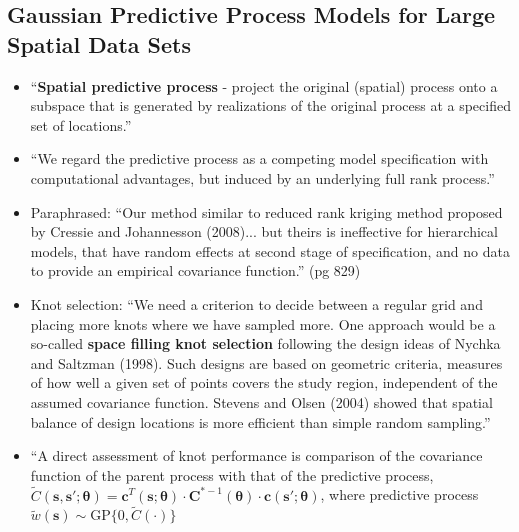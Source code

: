 \documentclass{article}
\begin{document}
\subsection*{Gaussian Predictive Process Models for Large Spatial Data Sets \citep{Banerjee2008}} %
\begin{itemize}
\item ``{\bf Spatial predictive process} - project the original (spatial) process onto a subspace that is generated by realizations of the original process at a specified set of locations.''
\item ``We regard the predictive process as a competing model specification with computational advantages, but induced by an underlying full rank process.''
\item Paraphrased: ``Our method similar to reduced rank kriging method proposed by Cressie and Johannesson (2008)... but theirs is ineffective for hierarchical models, that have random effects at second stage of specification, and no data to provide an empirical covariance function.'' (pg 829)
\item Knot selection: ``We need a criterion to decide between a regular grid and placing more knots where we have sampled more. One approach would be a so-called {\bf space filling knot selection} following the design ideas of Nychka and Saltzman (1998). Such designs are based on geometric criteria, measures of how well a given set of points covers the study region, independent of the assumed covariance function. Stevens and Olsen (2004) showed that spatial balance of design locations is more efficient than simple random sampling.''
\item ``A direct assessment of knot performance is comparison of the covariance function of the parent process with that of the predictive process, $\tilde{C}(\pmb{s}, \pmb{s}'; \pmb{\theta}) = \pmb{c}^{T}(\pmb{s};\pmb{\theta}) \cdot \pmb{C}^{*-1}(\pmb{\theta}) \cdot \pmb{c}(\pmb{s}';\pmb{\theta})$, where predictive process $\tilde{w}(\pmb{s}) \sim \text{GP}\{0, \tilde{C}(\cdot)\}$

\end{itemize}
\end{document}
